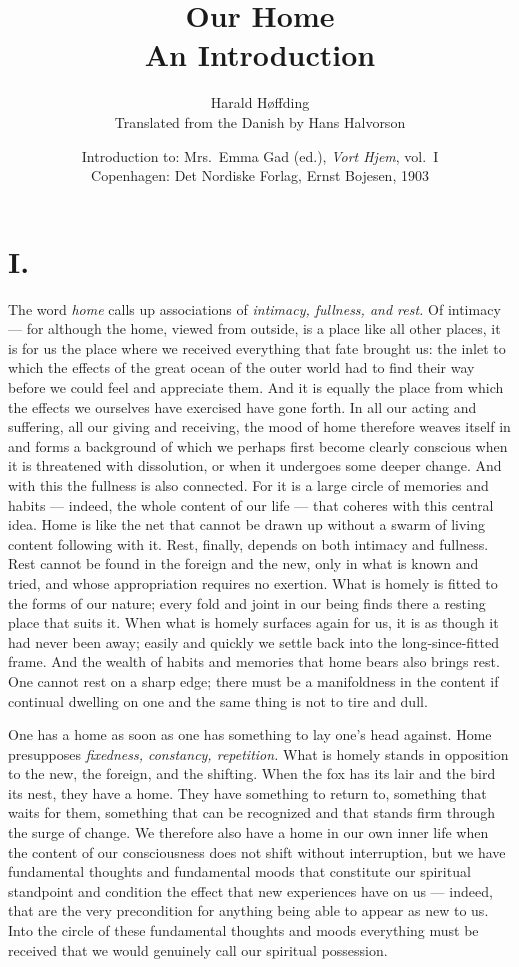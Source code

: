 \documentclass[12pt,a4paper]{article}
\title{\textbf{Our Home}\\[6pt]
  \large An Introduction}
\author{Harald Høffding\\[4pt]
  \small Translated from the Danish by Hans Halvorson}
\date{Introduction to: Mrs.\ Emma Gad (ed.),
  \emph{Vort Hjem}, vol.\ I\\
  Copenhagen: Det Nordiske Forlag, Ernst Bojesen, 1903}
\newcommand{\opage}[1]{\marginnote{\footnotesize\textit{[#1]}}}
\begin{document}
\maketitle
\thispagestyle{fancy}

\bigskip

\section*{I.}

\noindent \opage{3}The word \emph{home} calls up associations of \emph{intimacy, fullness, and rest.} Of intimacy --- for although the home, viewed
from outside, is a place like all other places, it is for us the place
where we received everything that fate brought us: the inlet to which
the effects of the great ocean of the outer world had to find their
way before we could feel and appreciate them. And it is equally the
place from which the effects we ourselves have exercised have gone
forth. In all our acting and suffering, all our giving and receiving,
the mood of home therefore weaves itself in and forms a background
of which we perhaps first become clearly conscious when it is
threatened with dissolution, or when it undergoes some deeper change.
And with this the fullness is also connected. For it is a large circle
of memories and habits --- indeed, the whole content of our life ---
that coheres with this central idea. Home is like the net that cannot
be drawn up without a swarm of living content following with it. Rest,
finally, depends on both intimacy and fullness. Rest cannot be found
in the foreign and the new, only in what is known and tried, and
whose appropriation requires no exertion. What is homely is fitted to
the forms of our nature; every fold and joint in our being finds there
a resting place that suits it. When what is homely surfaces again for
us, it is as though it had never been away; easily and quickly we
settle back into the long-since-fitted frame. And the wealth of habits
and memories that home bears also brings rest. One cannot \opage{4}rest on a
sharp edge; there must be a manifoldness in the content if continual
dwelling on one and the same thing is not to tire and dull.

One has a home as soon as one has something to lay one's head against.
Home presupposes \emph{fixedness, constancy, repetition.} What is homely
stands in opposition to the new, the foreign, and the shifting. When
the fox has its lair and the bird its nest, they have a home. They
have something to return to, something that waits for them, something
that can be recognized and that stands firm through the surge of
change. We therefore also have a home in our own inner life when
the content of our consciousness does not shift without interruption,
but we have fundamental thoughts and fundamental moods that
constitute our spiritual standpoint and condition the effect that new
experiences have on us --- indeed, that are the very precondition for
anything being able to appear as new to us. Into the circle of these
fundamental thoughts and moods everything must be received that we
would genuinely call our spiritual possession.
\end{document}
